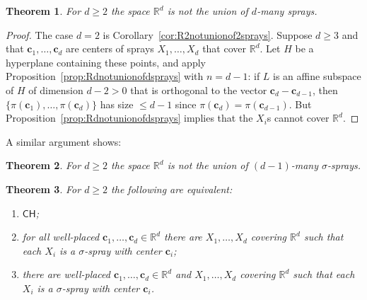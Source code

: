 \documentclass[12pt]{amsart}
\newcommand{\CH}{{\mathsf{CH}}}	%
\newcommand{\R}{\mathbb{R}}	%
\newcommand{\set}[1]{\mathopen \{ {#1} \mathclose \}} %
\theoremstyle{plain}
\newtheorem{theorem}{Theorem}[section]
\theoremstyle{definition}
\theoremstyle{remark}
\begin{document}
\begin{theorem}\label{th:Rdnotunionofdsprays}
For \( d \geq 2 \) the space \( \R^d \) is not the union of \( d \)-many sprays.
\end{theorem}

\begin{proof}
The case \( d = 2 \) is Corollary~\ref{cor:R2notunionof2sprays}.
Suppose \( d \geq 3 \) and that \( \mathbf{c}_1 , \dots , \mathbf{c}_d \) are centers of sprays \( X_1 , \dots , X_d \) that cover \( \R^d \).
Let \( H \) be a hyperplane containing these points, and apply Proposition~\ref{prop:Rdnotunionofdsprays} with \( n = d - 1 \): if \( L \) is an affine subspace of \( H \) of dimension \( d - 2 > 0 \) that is orthogonal to the vector \( \mathbf{c}_d - \mathbf{c}_{ d - 1} \), then \( \set{ \pi ( \mathbf{c}_1 ) , \dots , \pi ( \mathbf{c}_d ) } \) has size \( \leq d-1 \) since \( \pi ( \mathbf{c}_d ) = \pi ( \mathbf{c}_{ d - 1} ) \).
But Proposition~\ref{prop:Rdnotunionofdsprays} implies that the \( X_i \)s cannot cover \( \R^d \).
\end{proof}

A similar argument shows:

\begin{theorem}\label{th:Rdnotunionofd-1sigmasprays}
For \( d \geq 2 \) the space \( \R^d \) is not the union of \( ( d - 1 ) \)-many \( \sigma \)-sprays.
\end{theorem}

\begin{theorem}\label{th:sigmaspraysinRd}
For \( d \geq 2 \) the following are equivalent:
\begin{enumerate}[label={\upshape (\alph*)}]
\item\label{th:sigmaspraysinRd-a}
\( \CH \);
\item\label{th:sigmaspraysinRd-b}
for all well-placed \( \mathbf{c}_1 , \dots , \mathbf{c}_d \in \R^d \) there are \( X_1 , \dots , X_d \) covering \( \R^d \) such that each \( X_i \) is a \( \sigma \)-spray with center \( \mathbf{c}_i \);
\item\label{th:sigmaspraysinRd-c}
there are well-placed \( \mathbf{c}_1 , \dots , \mathbf{c}_d \in \R^d \) and \( X_1 , \dots , X_d \) covering \( \R^d \) such that each \( X_i \) is a \( \sigma \)-spray with center \( \mathbf{c}_i \).
\end{enumerate}
\end{theorem}
\end{document}
